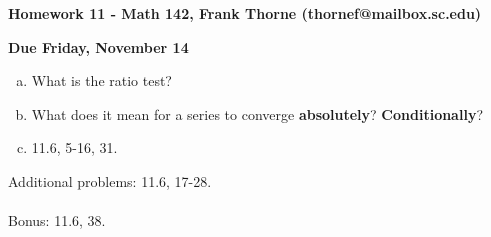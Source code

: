 \documentclass[12pt]{article}
\begin{document}
\setlength{\topmargin}{-2mm}





\begin{center}{\bf Homework 11 - Math 142, Frank Thorne (thornef@mailbox.sc.edu)}
\end{center}
\begin{center}
{\bf Due Friday, November 14}
\end{center}
\begin{enumerate}[(a)]


\item
What is the ratio test?

\item
What does it mean for a series to converge {\bf absolutely}? {\bf Conditionally}?

\item
11.6, 5-16, 31.

\end{enumerate}
Additional problems: 11.6, 17-28.
\\
\\
Bonus: 11.6, 38.
\end{document}
